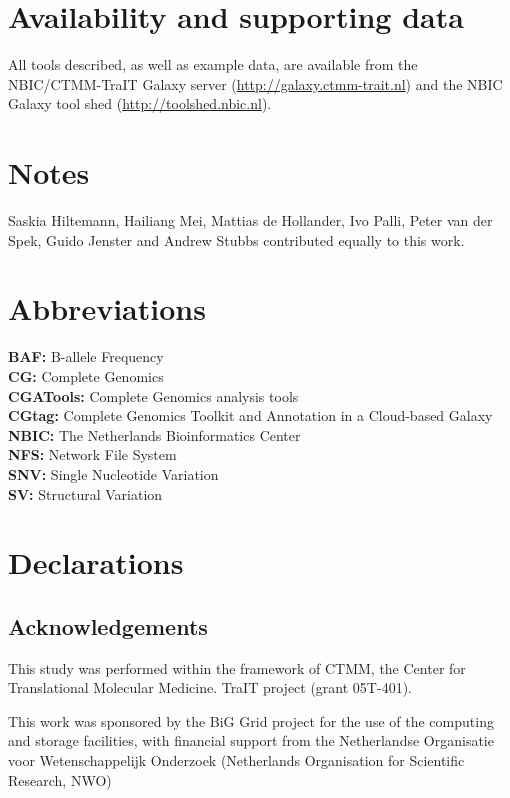 \section*{Availability and supporting data}

All tools described, as well as example data, are available from the NBIC/CTMM-TraIT Galaxy server (\url{http://galaxy.ctmm-trait.nl}) and the NBIC Galaxy tool shed (\url{http://toolshed.nbic.nl}).

\section*{Notes}

Saskia Hiltemann, Hailiang Mei, Mattias de Hollander, Ivo Palli, Peter van der Spek, Guido Jenster and Andrew Stubbs contributed equally to this work.

\section*{Abbreviations}

\textbf{BAF:} B-allele Frequency \\
\textbf{CG:} Complete Genomics \\
\textbf{CGATools:} Complete Genomics analysis tools \\
\textbf{CGtag:} Complete Genomics Toolkit and Annotation in a Cloud-based Galaxy\\
\textbf{NBIC:} The Netherlands Bioinformatics Center\\
\textbf{NFS:} Network File System \\
\textbf{SNV:} Single Nucleotide Variation\\
\textbf{SV:} Structural Variation\\


\section*{Declarations}

\subsection*{Acknowledgements}

This study was performed within the framework of CTMM, the Center for Translational Molecular Medicine. TraIT project (grant 05T-401).

This work was sponsored by the BiG Grid project for the use of the computing and storage facilities, with financial support from the Netherlandse Organisatie voor Wetenschappelijk Onderzoek (Netherlands Organisation for Scientific Research, NWO)

